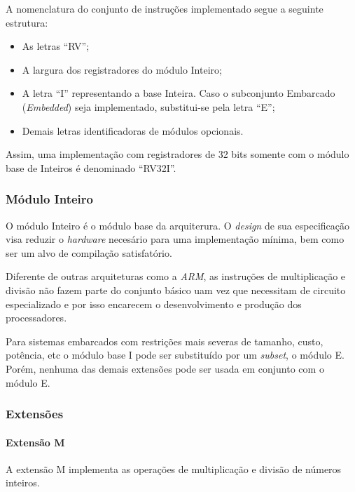     {
        A nomenclatura do conjunto de instruções implementado segue a
        seguinte estrutura:
    }

    \begin{itemize}[leftmargin=20mm]
        \item {As letras ``RV'';}
        \item {A largura dos registradores do módulo Inteiro;}
        \item {A letra ``I'' representando a base Inteira. Caso o subconjunto
                Embarcado (\textit{Embedded}) seja implementado, substitui-se
                pela letra ``E'';}
        \item {Demais letras identificadoras de módulos opcionais.}
    \end{itemize}

    {
        Assim, uma implementação com registradores de 32 bits somente com o
        módulo base de Inteiros é denominado ``RV32I''.
    }

        \subsubsection{Módulo Inteiro}
        {
            O módulo Inteiro é o módulo base da arquiterura. O \textit{design} de sua
            especificação visa reduzir o \textit{hardware} necesário para uma
            implementação mínima, bem como ser um alvo de compilação satisfatório.
        }

        {
            Diferente de outras arquiteturas como a \textit{ARM}, as instruções de
            multiplicação e divisão não fazem parte do conjunto básico uam vez que
            necessitam de circuito especializado e por isso encarecem o desenvolvimento
            e produção dos processadores.
        }

        {
            Para sistemas embarcados com restrições mais severas de tamanho, custo,
            potência, etc o módulo base I pode ser substituído por um \textit{subset},
            o módulo E. Porém, nenhuma das demais extensões pode ser usada em conjunto
            com o módulo E.
        }

        \subsubsection{Extensões}
            \paragraph{Extensão M}
            {
                A extensão M implementa as operações de multiplicação e divisão de
                números inteiros.
            }

